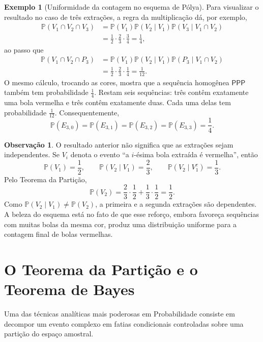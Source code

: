 \documentclass[12pt,portuguese]{article}
\theoremstyle{definition}
\newtheorem{example}[example]{Exemplo}
\newtheorem{remark}[remark]{Observação}
\begin{document}
\begin{example}[Uniformidade da contagem no esquema de Pólya]
Para visualizar o resultado no caso de três extrações, a regra da multiplicação dá, por exemplo,
\[
  \begin{aligned}
    \mathbb{P}(V_1\cap V_2\cap V_3)
    &=\mathbb{P}(V_1)\mathbb{P}(V_2\mid V_1)
      \mathbb{P}(V_3\mid V_1\cap V_2) \\
    &=\frac{1}{2}\cdot\frac{2}{3}\cdot\frac{3}{4}=\frac{1}{4},
  \end{aligned}
\]
ao passo que
\[
  \begin{aligned}
    \mathbb{P}(V_1\cap V_2\cap P_3)
    &=\mathbb{P}(V_1)\mathbb{P}(V_2\mid V_1)
      \mathbb{P}(P_3\mid V_1\cap V_2) \\
    &=\frac{1}{2}\cdot\frac{2}{3}\cdot\frac{1}{4}=\frac{1}{12}.
  \end{aligned}
\]
O mesmo cálculo, trocando as cores, mostra que a sequência homogênea
$\mathsf{PPP}$ também tem probabilidade $\frac{1}{4}$. Restam seis sequências:
três contêm exatamente uma bola vermelha e três contêm exatamente duas.
Cada uma delas tem probabilidade $\frac{1}{12}$. Consequentemente,
\[
  \mathbb{P}(E_{3,0})=\mathbb{P}(E_{3,1})
  =\mathbb{P}(E_{3,2})=\mathbb{P}(E_{3,3})=\frac{1}{4}.
\]
\end{example}

\begin{remark}
O resultado anterior não significa que as extrações sejam independentes. Se $V_i$ denota o evento ``a $i$-ésima bola extraída é vermelha'', então
\[
  \mathbb{P}(V_1)=\frac{1}{2},
  \qquad
  \mathbb{P}(V_2\mid V_1)=\frac{2}{3},
  \qquad
  \mathbb{P}(V_2\mid V_1^c)=\frac{1}{3}.
\]
Pelo Teorema da Partição,
\[
  \mathbb{P}(V_2)
  =\frac{2}{3}\cdot\frac{1}{2}+\frac{1}{3}\cdot\frac{1}{2}
  =\frac{1}{2}.
\]
Como $\mathbb{P}(V_2\mid V_1)\ne\mathbb{P}(V_2)$, a primeira e a segunda extrações são dependentes. A beleza do esquema está no fato de que esse reforço, embora favoreça sequências com muitas bolas da mesma cor, produz uma distribuição uniforme para a contagem final de bolas vermelhas.
\end{remark}

\section{O Teorema da Partição e o Teorema de Bayes}
\label{sec:particao-bayes}

Uma das técnicas analíticas mais poderosas em Probabilidade consiste em decompor um evento complexo em fatias condicionais controladas sobre uma partição do espaço amostral.
\end{document}
